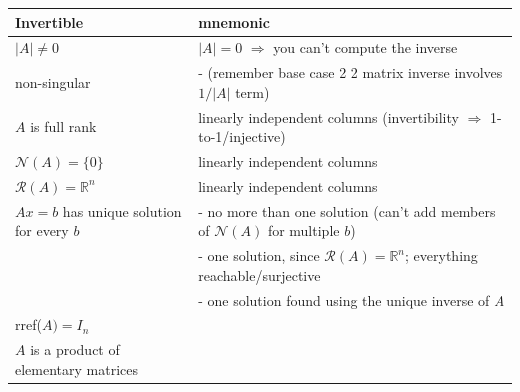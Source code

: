\documentclass[10pt,letterpaper]{article}
\begin{document}
\begin{center}
\begin{tabular}{ll}
 Invertible                                &  mnemonic                                                                                 \\
\hline
 $\vert A\vert \ne 0$                      &  $\vert A\vert = 0$ $\Rightarrow$ you can't compute the inverse                           \\
 non-singular                              &  - (remember base case 2 \texttimes{} 2 matrix inverse involves $1/\vert A\vert$ term)    \\
 $A$ is full rank                          &  linearly independent columns (invertibility $\Rightarrow$ 1-to-1/injective)              \\
 $\mathcal{N}(A)=\{0\}$                    &  linearly independent columns                                                             \\
 $\mathcal R (A)= \mathbb{R}^{n}$          &  linearly independent columns                                                             \\
 $Ax=b$ has unique solution for every $b$  &  - no more than one solution (can't add members of $\mathcal N (A)$ for multiple $b$)     \\
                                           &  - one solution, since $\mathcal R (A)= \mathbb{R}^{n}$; everything reachable/surjective  \\
                                           &  - one solution found using the unique inverse of \emph{A}                                \\
 rref($A)=I_n$                             &                                                                                           \\
 $A$ is a product of elementary matrices   &                                                                                           \\
\end{tabular}
\end{center}
\end{document}
